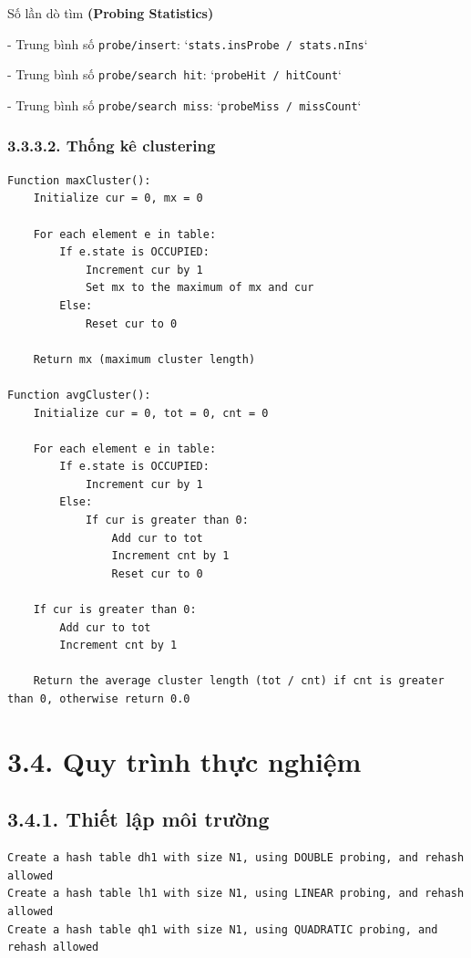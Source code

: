 \documentclass[12pt,a4paper]{report}
\begin{document}
\noindent \indent Số lần dò tìm \textbf{(Probing Statistics)}

- Trung bình số \texttt{probe/insert}: `\texttt{stats.insProbe / stats.nIns}`

- Trung bình số \texttt{probe/search hit}: `\texttt{probeHit / hitCount}`

- Trung bình số \texttt{probe/search miss}: `\texttt{probeMiss / missCount}`

\subsubsection*{3.3.3.2. Thống kê clustering}
\begin{lstlisting}[style=numbered]
Function maxCluster():
    Initialize cur = 0, mx = 0
    
    For each element e in table:
        If e.state is OCCUPIED:
            Increment cur by 1
            Set mx to the maximum of mx and cur
        Else:
            Reset cur to 0

    Return mx (maximum cluster length)

Function avgCluster():
    Initialize cur = 0, tot = 0, cnt = 0
    
    For each element e in table:
        If e.state is OCCUPIED:
            Increment cur by 1
        Else:
            If cur is greater than 0:
                Add cur to tot
                Increment cnt by 1
                Reset cur to 0

    If cur is greater than 0:
        Add cur to tot
        Increment cnt by 1
    
    Return the average cluster length (tot / cnt) if cnt is greater than 0, otherwise return 0.0
\end{lstlisting}

\section*{3.4. Quy trình thực nghiệm}

\subsection*{3.4.1. Thiết lập môi trường}
\begin{lstlisting}[style=numbered]
Create a hash table dh1 with size N1, using DOUBLE probing, and rehash allowed
Create a hash table lh1 with size N1, using LINEAR probing, and rehash allowed
Create a hash table qh1 with size N1, using QUADRATIC probing, and rehash allowed
\end{lstlisting}
\end{document}
